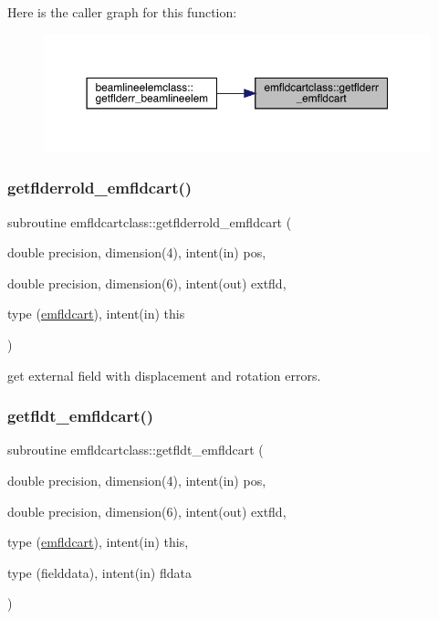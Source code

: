 Here is the caller graph for this function\+:\nopagebreak
\begin{figure}[H]
\begin{center}
\leavevmode
\includegraphics[width=350pt]{namespaceemfldcartclass_a4c48df0aca1d75a2301a87c5b1c0304d_icgraph}
\end{center}
\end{figure}
\mbox{\label{namespaceemfldcartclass_a8ab65fe6671e5e09361a2d44930aa93a}} 
\subsubsection{\texorpdfstring{getflderrold\_emfldcart()}{getflderrold\_emfldcart()}}
{\footnotesize\ttfamily subroutine emfldcartclass\+::getflderrold\+\_\+emfldcart (\begin{DoxyParamCaption}\item[{double precision, dimension(4), intent(in)}]{pos,  }\item[{double precision, dimension(6), intent(out)}]{extfld,  }\item[{type (\mbox{\hyperlink{namespaceemfldcartclass_structemfldcartclass_1_1emfldcart}{emfldcart}}), intent(in)}]{this }\end{DoxyParamCaption})}



get external field with displacement and rotation errors. 

\mbox{\label{namespaceemfldcartclass_a63a14e90f4526aa45d3d28a9611d3908}} 
\subsubsection{\texorpdfstring{getfldt\_emfldcart()}{getfldt\_emfldcart()}}
{\footnotesize\ttfamily subroutine emfldcartclass\+::getfldt\+\_\+emfldcart (\begin{DoxyParamCaption}\item[{double precision, dimension(4), intent(in)}]{pos,  }\item[{double precision, dimension(6), intent(out)}]{extfld,  }\item[{type (\mbox{\hyperlink{namespaceemfldcartclass_structemfldcartclass_1_1emfldcart}{emfldcart}}), intent(in)}]{this,  }\item[{type (fielddata), intent(in)}]{fldata }\end{DoxyParamCaption})}



